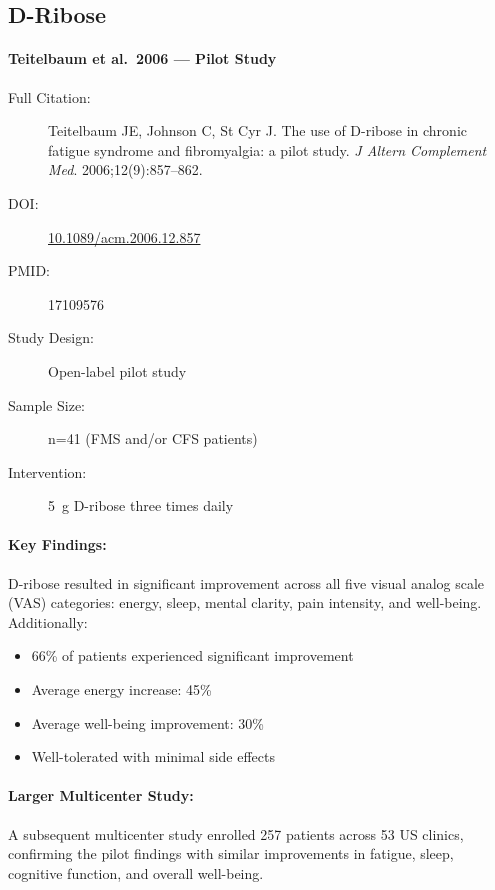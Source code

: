 \subsection{D-Ribose}

\paragraph{Teitelbaum et al.\ 2006 --- Pilot Study}

\begin{description}
    \item[Full Citation:] Teitelbaum JE, Johnson C, St Cyr J. The use of D-ribose in chronic fatigue syndrome and fibromyalgia: a pilot study. \textit{J Altern Complement Med}. 2006;12(9):857--862.
    \item[DOI:] \href{https://doi.org/10.1089/acm.2006.12.857}{10.1089/acm.2006.12.857}
    \item[PMID:] 17109576
    \item[Study Design:] Open-label pilot study
    \item[Sample Size:] n=41 (FMS and/or CFS patients)
    \item[Intervention:] 5~g D-ribose three times daily
\end{description}

\paragraph{Key Findings:}
D-ribose resulted in significant improvement across all five visual analog scale (VAS) categories: energy, sleep, mental clarity, pain intensity, and well-being. Additionally:
\begin{itemize}
    \item 66\% of patients experienced significant improvement
    \item Average energy increase: 45\%
    \item Average well-being improvement: 30\%
    \item Well-tolerated with minimal side effects
\end{itemize}

\paragraph{Larger Multicenter Study:}
A subsequent multicenter study enrolled 257 patients across 53 US clinics, confirming the pilot findings with similar improvements in fatigue, sleep, cognitive function, and overall well-being.

